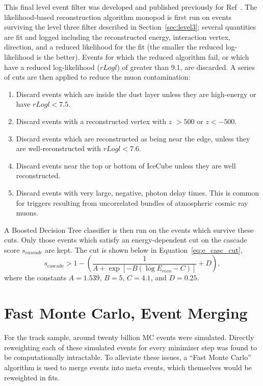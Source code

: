 \documentclass[main.tex]{subfiles}
\begin{document}
This final level event filter was developed and published previously for Ref~\cite{2018PhDT17N}.
The likelihood-based reconstruction algorithm monopod is first run on events surviving the level three filter described in Section~\ref{sec:level3};
several quantities are fit and logged including the reconstructed energy, interaction vertex, direction, and a reduced likelihood for the fit (the smaller the reduced log-likelihood is the better).
Events for which the reduced algorithm fail, or which have a reduced log-likelihood ($rLogl$) of greater than 9.1, are discarded. 
A series of cuts are then applied to reduce the muon contamination: 
\begin{enumerate}
    \item Discard events which are inside the dust layer unless they are high-energy or have $rLogl<7.5$. 
    \item Discard events with a reconstructed vertex with $z$ $>500$ or $z<-500$. 
    \item Discard events which are reconstructed as being near the edge, unless they are well-reconstructed with $rLogl<7.6$.
    \item Discard events near the top or bottom of IceCube unless they are well reconstructed. 
    \item Discard events with very large, negative, photon delay times. This is common for triggers resulting from uncorrelated bundles of atmospheric cosmic ray muons. 
\end{enumerate}
A Boosted Decision Tree classifier is then run on the events which survive these cuts.  
Only those events which satisfy an energy-dependent cut on the cascade score $s_{cascade}$ are kept. The cut is shown below in Equation~\eqref{eq:e_casc_cut},
\begin{equation}
    s_{\text{cascade}} > 1 - \left(\dfrac{1}{A + \exp\left[ -B(\log E_{reco} - C) \right]} + D\right),
\end{equation}\label{eq:e_casc_cut}
where the constants $A=1.539$, $B=5$, $C=4.1$, and $D=0.25$.


\section{Fast Monte Carlo, Event Merging}

For the track sample, around twenty billion MC events were simulated. 
Directly reweighting each of these simulated events for every minimizer step was found to be computationally intractable.
To alleviate these issues, a ``Fast Monte Carlo'' algorithm is used to merge events into meta events, which themselves would be reweighted in fits. 
\end{document}
